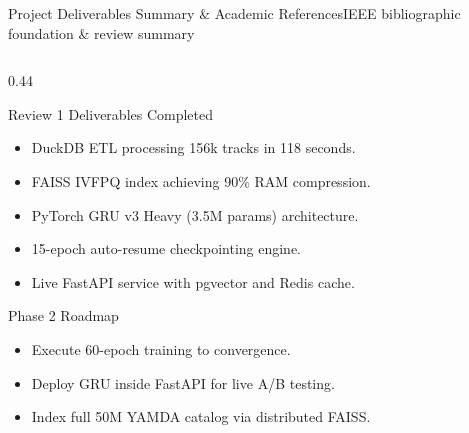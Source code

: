 \documentclass[aspectratio=169,10pt]{beamer}
\begin{document}
\begin{frame}{Project Deliverables Summary \& Academic References}{IEEE bibliographic foundation \& review summary}
    \begin{columns}[T]
        \begin{column}{0.44\textwidth}
            \begin{exampleblock}{Review 1 Deliverables Completed}
                \begin{itemize}\fontsize{5.8pt}{7.5pt}\selectfont
                    \item DuckDB ETL processing 156k tracks in 118 seconds.
                    \item FAISS IVFPQ index achieving 90\% RAM compression.
                    \item PyTorch GRU v3 Heavy (3.5M params) architecture.
                    \item 15-epoch auto-resume checkpointing engine.
                    \item Live FastAPI service with pgvector and Redis cache.
                \end{itemize}
            \end{exampleblock}

            \begin{block}{Phase 2 Roadmap}
                \begin{itemize}\fontsize{5.8pt}{7.5pt}\selectfont
                    \item Execute 60-epoch training to convergence.
                    \item Deploy GRU inside FastAPI for live A/B testing.
                    \item Index full 50M YAMDA catalog via distributed FAISS.
                \end{itemize}
            \end{block}
        \end{column}


\end{columns}
\end{frame}
\end{document}
